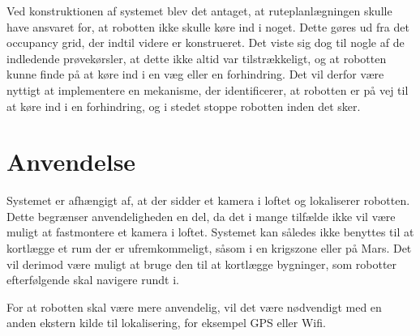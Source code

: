 Ved konstruktionen af systemet blev det antaget, at ruteplanlægningen skulle have ansvaret for, at robotten ikke skulle køre ind i noget. 
Dette gøres ud fra det occupancy grid, der indtil videre er konstrueret.
Det viste sig dog til nogle af de indledende prøvekørsler, at dette ikke altid var tilstrækkeligt, og at robotten kunne finde på at køre ind i en væg eller en forhindring.
Det vil derfor være nyttigt at implementere en mekanisme, der identificerer, at robotten er på vej til at køre ind i en forhindring, og i stedet stoppe robotten inden det sker. 

\section{Anvendelse}
Systemet er afhængigt af, at der sidder et kamera i loftet og lokaliserer robotten.
Dette begrænser anvendeligheden en del, da det i mange tilfælde ikke vil være muligt at fastmontere et kamera i loftet.
Systemet kan således ikke benyttes til at kortlægge et rum der er ufremkommeligt, såsom i en krigszone eller på Mars.
Det vil derimod være muligt at bruge den til at kortlægge bygninger, som robotter efterfølgende skal navigere rundt i.

For at robotten skal være mere anvendelig, vil det være nødvendigt med en anden ekstern kilde til lokalisering, for eksempel GPS eller Wifi.